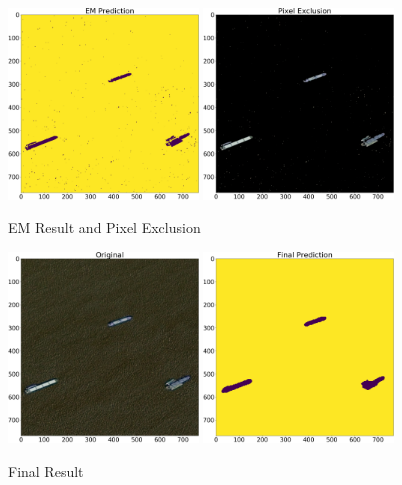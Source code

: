 \begin{figure}[h] 
	\centering
	\includegraphics[width=0.45\textwidth]{Pictures/011EMPred.png}
	\includegraphics[width=0.45\textwidth]{Pictures/014PixelExclusion.png}
	\caption{EM Result and Pixel Exclusion}
	\label{em_pic_unet}
\end{figure}
\begin{figure}[h]
	\centering
	\includegraphics[width=0.45\textwidth]{Pictures/011Original.png}
	\includegraphics[width=0.45\textwidth]{Pictures/014FinalResult.png}
	\caption{Final Result}
	\label{final_result_pic_unet}
\end{figure}